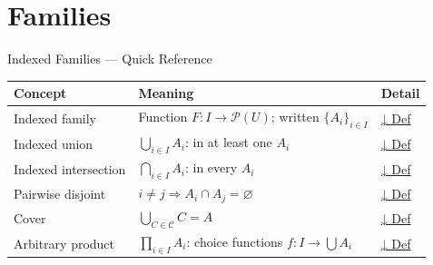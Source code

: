 \section{Families}


\begin{toolkitbox}{Indexed Families — Quick Reference}
\small
\begin{tabular}{l l l}
\toprule
\textbf{Concept} & \textbf{Meaning} & \textbf{Detail} \\
\midrule
Indexed family      & Function $F : I \to \mathcal{P}(U)$; written $\{A_i\}_{i \in I}$ & \hyperref[def:indexed-family]{↓ Def} \\
Indexed union       & $\bigcup_{i \in I} A_i$: in at least one $A_i$                    & \hyperref[def:indexed-union]{↓ Def} \\
Indexed intersection & $\bigcap_{i \in I} A_i$: in every $A_i$                         & \hyperref[def:indexed-intersection]{↓ Def} \\
Pairwise disjoint   & $i \neq j \Rightarrow A_i \cap A_j = \varnothing$                  & \hyperref[def:pairwise-disjoint]{↓ Def} \\
Cover               & $\bigcup_{C \in \mathcal{C}} C = A$                               & \hyperref[def:cover]{↓ Def} \\
Arbitrary product   & $\prod_{i \in I} A_i$: choice functions $f : I \to \bigcup A_i$   & \hyperref[def:arbitrary-product]{↓ Def} \\
\bottomrule
\end{tabular}
\end{toolkitbox}



